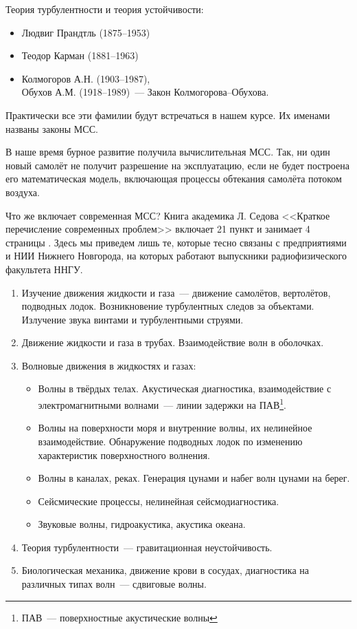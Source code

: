 Теория турбулентности и теория устойчивости:
\begin{itemize}
	\setlength\itemsep{-0.4em}
	\item Людвиг Прандтль  (1875--1953)
	\item Теодор Карман (1881--1963)
	\item Колмогоров А.Н.  (1903--1987), \\Обухов А.М.   (1918--1989)~---  Закон Колмогорова--Обухова.
\end{itemize}

Практически все эти фамилии будут встречаться в нашем курсе. Их именами названы законы {МСС}.

В наше время бурное развитие получила вычислительная {МСС}. Так, ни один новый самолёт не получит разрешение на эксплуатацию, если не будет построена его математическая модель, включающая процессы обтекания самолёта потоком воздуха.

Что же включает современная {МСС}? Книга академика Л. Седова <<Краткое перечисление современных проблем>> включает 21 пункт и занимает 4 страницы \cite{nu10}. Здесь мы приведем лишь те, которые тесно связаны с предприятиями и НИИ Нижнего Новгорода, на которых работают выпускники радиофизического факультета ННГУ.

\begin{enumerate}
	\item Изучение движения жидкости и газа~--- движение самолётов, вертолётов, подводных лодок.  Возникновение турбулентных следов за объектами. Излучение звука винтами и турбулентными струями.
	\item Движение жидкости и газа в трубах. Взаимодействие волн в оболочках.
	\item Волновые движения в жидкостях и газах:
	\begin{itemize}
		\item Волны в твёрдых телах.  Акустическая диагностика, взаимодействие с электромагнитными волнами~--- линии задержки на ПАВ\footnote{ПАВ~--- поверхностные акустические волны}.
		\item Волны на поверхности моря и внутренние волны, их нелинейное взаимодействие. Обнаружение подводных лодок по изменению характеристик поверхностного волнения.
		\item Волны в каналах, реках. Генерация цунами и  набег волн цунами на берег.
		\item Сейсмические процессы, нелинейная сейсмодиагностика.
		\item Звуковые волны,  гидроакустика, акустика океана.
	\end{itemize}
	\item Теория турбулентности~--- гравитационная неустойчивость.
	\item Биологическая механика, движение крови в сосудах, диагностика на различных типах волн~--- сдвиговые волны.
\end{enumerate}


